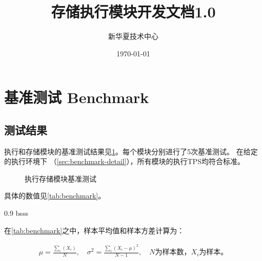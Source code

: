 \documentclass[dvipsnames]{ctexart}
\title{存储执行模块开发文档1.0}
\date{\today}
\author{新华夏技术中心}
\begin{document}
\maketitle
\tableofcontents{}
\newpage{}


\section{基准测试 Benchmark}
\label{sec:benchmark}

\subsection{测试结果}

执行和存储模块的基准测试结果见\cref{fig:benchmark}。每个模块分别进行了5次基准测试。
在给定的执行环境下 （\cref{sec:benchmark-detail}），所有模块的执行TPS均符合标准。
\begin{figure}[h]
  \centering
  \caption{执行存储模块基准测试}
  
  \label{fig:benchmark}
\end{figure}


具体的数值见\cref{tab:benchmark}。
\begin{table}[h]
  \centering
  \newcolumntype{b}{X}
  \newcommand{\heading}[1]{\multicolumn{1}{c}{#1}}
  \begin{tabularx}{0.9\textwidth} { 
      bsss
    }

    \hline
    
  \end{tabularx}
  \caption{基准测试数值结果 （单位： 万）}
  \label{tab:benchmark}
\end{table}
\FloatBarrier
在\cref{tab:benchmark}之中，样本平均值和样本方差计算为：

\begin{align*}
  \mu  = \frac{\sum_i(X_i)}{N}, \quad
  \sigma^2 = \frac{\sum_i(X_i - \mu)^2}{N-1}, \quad
  \text{$N$为样本数，$X_i$为样本。}
\end{align*}
\end{document}

